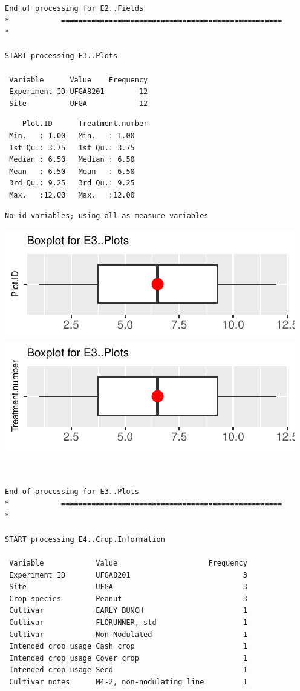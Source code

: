 \documentclass[
]{article}
\begin{document}
\begin{verbatim}
End of processing for E2..Fields
*            ===================================================            *

START processing E3..Plots

 Variable      Value    Frequency
 Experiment ID UFGA8201        12
 Site          UFGA            12
\end{verbatim}

\begin{verbatim}
    Plot.ID      Treatment.number
 Min.   : 1.00   Min.   : 1.00   
 1st Qu.: 3.75   1st Qu.: 3.75   
 Median : 6.50   Median : 6.50   
 Mean   : 6.50   Mean   : 6.50   
 3rd Qu.: 9.25   3rd Qu.: 9.25   
 Max.   :12.00   Max.   :12.00   
\end{verbatim}

\begin{verbatim}
No id variables; using all as measure variables
\end{verbatim}

\includegraphics{FL_Crop_BMP_QA_single_dataset_files/figure-latex/check-content-of-sheets-5.pdf}
\includegraphics{FL_Crop_BMP_QA_single_dataset_files/figure-latex/check-content-of-sheets-6.pdf}

\begin{verbatim}


End of processing for E3..Plots
*            ===================================================            *

START processing E4..Crop.Information

 Variable            Value                     Frequency
 Experiment ID       UFGA8201                          3
 Site                UFGA                              3
 Crop species        Peanut                            3
 Cultivar            EARLY BUNCH                       1
 Cultivar            FLORUNNER, std                    1
 Cultivar            Non-Nodulated                     1
 Intended crop usage Cash crop                         1
 Intended crop usage Cover crop                        1
 Intended crop usage Seed                              1
 Cultivar notes      M4-2, non-nodulating line         1
\end{verbatim}
\end{document}
